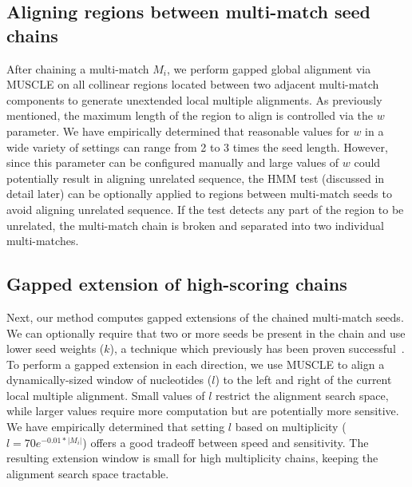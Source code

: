 \documentclass[12pt,journal,draftcls,letterpaper,onecolumn]{IEEEtran}
\begin{document}
\subsection{Aligning regions between multi-match seed chains}
After chaining a multi-match $M_i$, we perform gapped global alignment via MUSCLE on all
collinear regions located between two adjacent multi-match components to generate
unextended local multiple alignments. As previously mentioned, the maximum length of the region to align
is controlled via the $w$ parameter. We have empirically determined that reasonable values
for $w$ in a wide variety of settings can range from 2 to 3 times the seed length. However, since this
parameter can be configured manually and large values of
$w$ could potentially result in aligning unrelated sequence, the HMM test (discussed in detail later) can be optionally applied
to regions between multi-match seeds to avoid aligning unrelated sequence. If the test detects any part of the
region to be unrelated, the multi-match chain is broken and separated into two individual multi-matches.

\subsection{Gapped extension of high-scoring chains}
Next, our method computes gapped extensions of the chained multi-match seeds.
We can optionally require that two or more seeds be present
in the chain and use lower seed weights ($k$), a technique which previously has
been proven
successful~\cite{ref-blastz,ref-gappedblast,ref-blat}.  To perform a
gapped extension in each direction, we use MUSCLE to align a dynamically-sized window
of nucleotides ($l$) to the left and right of the current local
multiple alignment.  Small values of $l$ restrict the alignment search
space, while larger values require more computation but are
potentially more sensitive.  We have empirically determined that
setting $l$ based on multiplicity ($l = 70e^{-0.01*|M_{i}|}$) offers a
good tradeoff between speed and sensitivity.  The resulting extension
window is small for high multiplicity chains,
keeping the alignment search space tractable.
\end{document}
